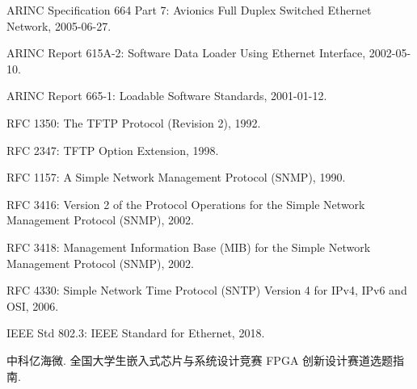 \begingroup
\small\linespread{1.08}\selectfont
\begin{enumerate}[label={[\arabic*]},leftmargin=2.5em]
  \item ARINC Specification 664 Part 7: Avionics Full Duplex Switched Ethernet Network, 2005-06-27.
  \item ARINC Report 615A-2: Software Data Loader Using Ethernet Interface, 2002-05-10.
  \item ARINC Report 665-1: Loadable Software Standards, 2001-01-12.
  \item RFC 1350: The TFTP Protocol (Revision 2), 1992.
  \item RFC 2347: TFTP Option Extension, 1998.
  \item RFC 1157: A Simple Network Management Protocol (SNMP), 1990.
  \item RFC 3416: Version 2 of the Protocol Operations for the Simple Network Management Protocol (SNMP), 2002.
  \item RFC 3418: Management Information Base (MIB) for the Simple Network Management Protocol (SNMP), 2002.
  \item RFC 4330: Simple Network Time Protocol (SNTP) Version 4 for IPv4, IPv6 and OSI, 2006.
  \item IEEE Std 802.3: IEEE Standard for Ethernet, 2018.
  \item 中科亿海微. 全国大学生嵌入式芯片与系统设计竞赛 FPGA 创新设计赛道选题指南.
\end{enumerate}
\endgroup
